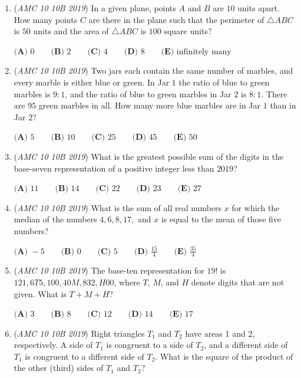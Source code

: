 \begin{enumerate}
 $\textbf{(A) }$ $\{-1, 0\}$
$\textbf{(B) }$ $\text{The set of nonpositive integers}$
$\textbf{(C) }$ $\{-1, 0, 1\}$
$\textbf{(D) }$ $\{0\}$
$\textbf{(E) }$ $\text{The set of nonnegative integers}$


	\item (\textit{AMC 10 10B 2019}) In a given plane, points $A$ and $B$ are $10$ units apart. How many points $C$ are there in the plane such that the perimeter of $\triangle ABC$ is $50$ units and the area of $\triangle ABC$ is $100$ square units?


 $\textbf{(A) }0\qquad\textbf{(B) }2\qquad\textbf{(C) }4\qquad\textbf{(D) }8\qquad\textbf{(E) }\text{infinitely many}$


	\item (\textit{AMC 10 10B 2019}) Two jars each contain the same number of marbles, and every marble is either blue or green. In Jar $1$ the ratio of blue to green marbles is $9:1$, and the ratio of blue to green marbles in Jar $2$ is $8:1$. There are $95$ green marbles in all. How many more blue marbles are in Jar $1$ than in Jar $2$?


 $\textbf{(A) } 5 \qquad\textbf{(B) } 10 \qquad\textbf{(C) } 25 \qquad\textbf{(D) } 45 \qquad\textbf{(E) } 50$


	\item (\textit{AMC 10 10B 2019}) What is the greatest possible sum of the digits in the base-seven representation of a positive integer less than $2019$?


 $\textbf{(A) } 11 \qquad\textbf{(B) } 14 \qquad\textbf{(C) } 22 \qquad\textbf{(D) } 23 \qquad\textbf{(E) } 27$


	\item (\textit{AMC 10 10B 2019}) What is the sum of all real numbers $x$ for which the median of the numbers $4,6,8,17,$ and $x$ is equal to the mean of those five numbers?


 $\textbf{(A) } -5 \qquad\textbf{(B) } 0 \qquad\textbf{(C) } 5 \qquad\textbf{(D) } \frac{15}{4} \qquad\textbf{(E) } \frac{35}{4}$


	\item (\textit{AMC 10 10B 2019}) The base-ten representation for $19!$ is $121,6T5,100,40M,832,H00$, where $T$, $M$, and $H$ denote digits that are not given. What is $T+M+H$?


 $\textbf{(A) }3 \qquad\textbf{(B) }8 \qquad\textbf{(C) }12 \qquad\textbf{(D) }14 \qquad\textbf{(E) } 17$


	\item (\textit{AMC 10 10B 2019}) Right triangles $T_1$ and $T_2$ have areas 1 and 2, respectively. A side of $T_1$ is congruent to a side of $T_2$, and a different side of $T_1$ is congruent to a different side of $T_2$. What is the square of the product of the other (third) sides of $T_1$ and $T_2$?



\end{enumerate}
